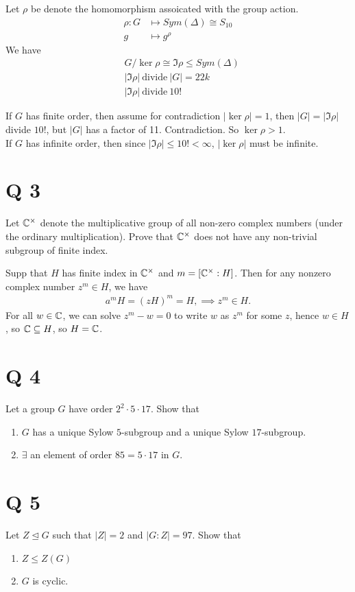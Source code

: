 \documentclass[12pt,english]{article}
\begin{document}
Let $\rho$ be denote the homomorphism assoicated with the group action.
\begin{align*}
    \rho: G &\mapsto Sym(\Delta) \cong S_{10}\\
    g &\mapsto g^{\rho}
\end{align*}
We have
\begin{align*}
    &G/\ker \rho \cong \Im \rho \leq Sym (\Delta) \\
    & |\Im \rho| \ \text{divide} \ |G| = 22k\\
    & |\Im \rho| \ \text{divide} \ 10!
\end{align*}

If $G$ has finite order, then assume for contradiction $|\ker \rho | =1$, then $|G| = |\Im \rho|$ divide $10!$, but $|G|$ has a factor of 11. Contradiction. So $\ker \rho >1$. \\

If $G$ has infinite order, then since $|\Im \rho| \leq 10! < \infty$, $|\ker \rho|$ must be infinite. 


\section*{Q 3}
\begin{question}
Let $\mathbb{C}^{\times}$ denote the multiplicative group of all non-zero complex numbers (under the ordinary multiplication). Prove that $\mathbb{C}^{\times}$ does not have any non-trivial subgroup of finite index.
\end{question}
Supp that $H$ has finite index in $\mathbb{C}^{\times}$ and $m = [\mathbb{C}^{\times}:H]$. Then for any nonzero complex number $z^m \in H$, we have
\begin{align*}
    a^m H = (zH)^m = H, \implies z^m \in H.
\end{align*} For all $w \in \mathbb{C}$, we can solve $z^m -w =0$ to write $w$ as $z^m$ for some $z$, hence $w\in H$, so $\mathbb{C} \subseteq H$, so $H = \mathbb{C}$. 


\section*{Q 4}
\begin{proposition}
Let a group $G$ have order $2^2 \cdot 5 \cdot 17$. Show that 
\begin{enumerate}
    \item $G$ has a unique Sylow $5$-subgroup and a unique Sylow $17$-subgroup.
    \item $\exists$ an element of order $85 = 5 \cdot 17$ in $G$.
\end{enumerate}

\end{proposition}


\section*{Q 5}
\begin{proposition}
    Let $Z \trianglelefteq G$ such that $ \lvert Z \rvert = 2$ and $ \lvert G:Z \rvert =97 $. Show that
    \begin{enumerate}
        \item $Z \leq Z(G)$
        \item $G$ is cyclic.
    \end{enumerate}
    
\end{proposition}
\end{document}
